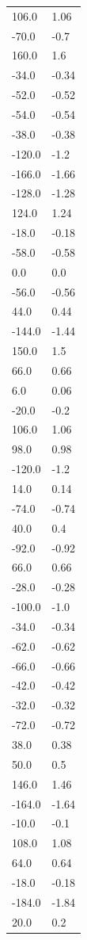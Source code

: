 \begin{longtable}{ll}
106.0 & 1.06 \\
-70.0 & -0.7 \\
160.0 & 1.6 \\
-34.0 & -0.34 \\
-52.0 & -0.52 \\
-54.0 & -0.54 \\
-38.0 & -0.38 \\
-120.0 & -1.2 \\
-166.0 & -1.66 \\
-128.0 & -1.28 \\
124.0 & 1.24 \\
-18.0 & -0.18 \\
-58.0 & -0.58 \\
0.0 & 0.0 \\
-56.0 & -0.56 \\
44.0 & 0.44 \\
-144.0 & -1.44 \\
150.0 & 1.5 \\
66.0 & 0.66 \\
6.0 & 0.06 \\
-20.0 & -0.2 \\
106.0 & 1.06 \\
98.0 & 0.98 \\
-120.0 & -1.2 \\
14.0 & 0.14 \\
-74.0 & -0.74 \\
40.0 & 0.4 \\
-92.0 & -0.92 \\
66.0 & 0.66 \\
-28.0 & -0.28 \\
-100.0 & -1.0 \\
-34.0 & -0.34 \\
-62.0 & -0.62 \\
-66.0 & -0.66 \\
-42.0 & -0.42 \\
-32.0 & -0.32 \\
-72.0 & -0.72 \\
38.0 & 0.38 \\
50.0 & 0.5 \\
146.0 & 1.46 \\
-164.0 & -1.64 \\
-10.0 & -0.1 \\
108.0 & 1.08 \\
64.0 & 0.64 \\
-18.0 & -0.18 \\
-184.0 & -1.84 \\
20.0 & 0.2 \\

\end{longtable}
